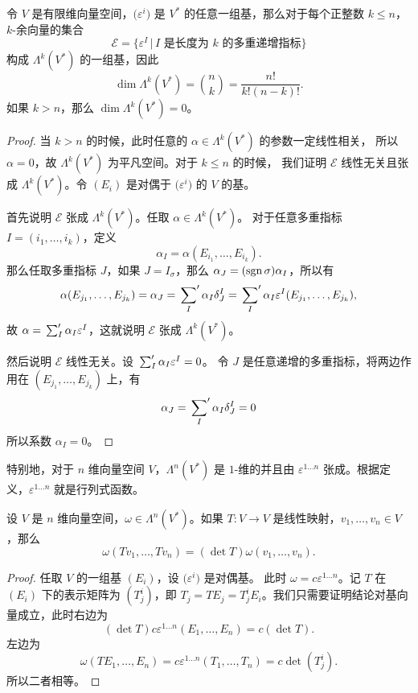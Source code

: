 \begin{proposition}\label{prop:basis of Lambda}
  令 $V$ 是有限维向量空间，$\bigl(\varepsilon^i\bigr)$ 是 $V^*$
  的任意一组基，那么对于每个正整数 $k\leq n$，$k$-余向量的集合
  \[
    \mathcal{E}=\bigl\{\varepsilon^I\,|\, \text{$I$ 是长度为 $k$ 的多重递增指标}\bigr\}  
  \]
  构成 $\Lambda^k(V^*)$ 的一组基，因此
  \[
    \dim\Lambda^k(V^*)=\binom{n}{k}=\frac{n!}{k!(n-k)!}.  
  \]
  如果 $k> n$，那么 $\dim\Lambda^k(V^*)=0$。
\end{proposition}
\begin{proof}
  当 $k>n$ 的时候，此时任意的 $\alpha\in \Lambda^k(V^*)$ 的参数一定线性相关，
  所以 $\alpha=0$，故 $\Lambda^k(V^*)$ 为平凡空间。对于 $k\le n$ 的时候，
  我们证明 $\mathcal{E}$ 线性无关且张成 $\Lambda^k(V^*)$。令 $(E_i)$
  是对偶于 $\bigl(\varepsilon^i\bigr)$ 的 $V$ 的基。

  首先说明 $\mathcal{E}$ 张成 $\Lambda^k(V^*)$。任取 $\alpha\in \Lambda^k(V^*)$。
  对于任意多重指标 $I=(i_1,\dots,i_k)$，定义
  \[
    \alpha_I=\alpha(E_{i_1},\dots,E_{i_k}).  
  \]
  那么任取多重指标 $J$，如果 $J=I_\sigma$，那么 $\alpha_J=(\operatorname{sgn}\sigma)\alpha_I$，所以有
  \[
    \alpha(E_{j_1},\dots,E_{j_k})=\alpha_J=\sideset{}{'}\sum_{I}\alpha_I\delta_J^I
    =  \sideset{}{'}\sum_I\alpha_I\varepsilon^I(E_{j_1},\dots,E_{j_k}),
  \]
  故 $\alpha=\sideset{}{'}{\textstyle\sum_I}\alpha_I\varepsilon^I$，这就说明  $\mathcal{E}$ 张成 $\Lambda^k(V^*)$。

  然后说明 $\mathcal{E}$ 线性无关。设 $\sideset{}{'}{\textstyle\sum_I}\alpha_I\varepsilon^I=0$。
  令 $J$ 是任意递增的多重指标，将两边作用在 $(E_{j_1},\dots,E_{j_k})$ 上，有
  \[
    \alpha_J=\sideset{}{'}\sum_I\alpha_I\delta_J^I=0  
  \]
  所以系数 $\alpha_I=0$。
\end{proof}

特别地，对于 $n$ 维向量空间 $V$，$\Lambda^n(V^*)$ 是 $1$-维的并且由
$\varepsilon^{1\dots n}$ 张成。根据定义，$\varepsilon^{1\dots n}$
就是行列式函数。

\begin{proposition}
  设 $V$ 是 $n$ 维向量空间，$\omega\in \Lambda^n(V^*)$。如果 $T:V\to V$
  是线性映射，$v_1,\dots,v_n\in V$，那么
  \begin{equation}
    \omega(Tv_1,\dots,Tv_n)=(\det T)\omega(v_1,\dots,v_n).
  \end{equation}
\end{proposition}
\begin{proof}
  任取 $V$ 的一组基 $(E_i)$，设 $\bigl(\varepsilon^i\bigr)$ 是对偶基。
  此时 $\omega=c\varepsilon^{1\dots n}$。记 $T$ 在 $(E_i)$ 下的表示矩阵为
  $(T_j^i)$，即 $T_j=TE_j=T_j^iE_i$。我们只需要证明结论对基向量成立，此时右边为
  \[
    (\det T)c\varepsilon^{1\dots n}(E_1,\dots,E_n)=c(\det T).
  \]
  左边为
  \[
    \omega(TE_1,\dots,E_n)=c\varepsilon^{1\dots n}
    (T_1,\dots,T_n)=c\det (T_j^i).  
  \]
  所以二者相等。
\end{proof}

